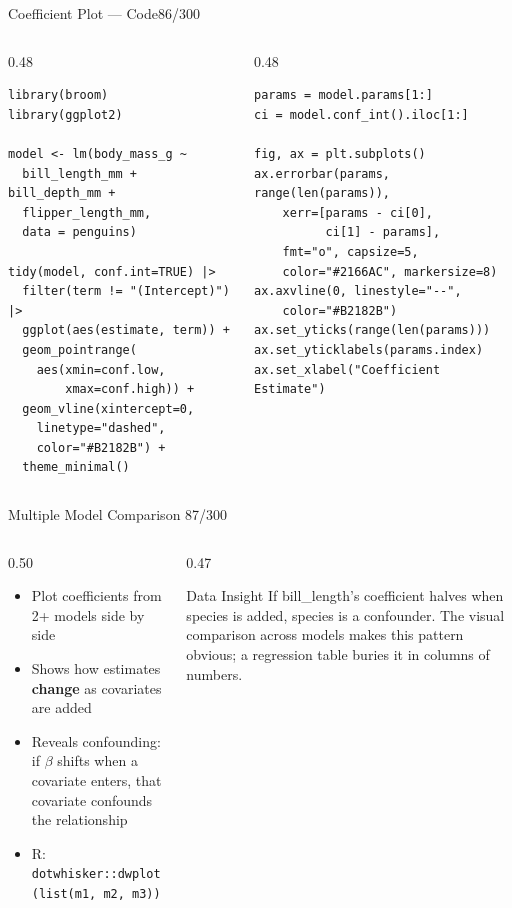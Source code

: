 \documentclass[10pt]{beamer}
\newcommand{\smark}[1]{\hfill{\scriptsize\color{codegray}#1}}
\begin{document}
\begin{frame}[fragile]{Coefficient Plot --- Code}\smark{86/300}
\begin{columns}[T]
\begin{column}{0.48\textwidth}
\begin{lstlisting}[style=Rstyle]
library(broom)
library(ggplot2)

model <- lm(body_mass_g ~
  bill_length_mm + bill_depth_mm +
  flipper_length_mm,
  data = penguins)

tidy(model, conf.int=TRUE) |>
  filter(term != "(Intercept)") |>
  ggplot(aes(estimate, term)) +
  geom_pointrange(
    aes(xmin=conf.low,
        xmax=conf.high)) +
  geom_vline(xintercept=0,
    linetype="dashed",
    color="#B2182B") +
  theme_minimal()
\end{lstlisting}
\end{column}
\begin{column}{0.48\textwidth}
\begin{lstlisting}[style=Pystyle]
params = model.params[1:]
ci = model.conf_int().iloc[1:]

fig, ax = plt.subplots()
ax.errorbar(params, range(len(params)),
    xerr=[params - ci[0],
          ci[1] - params],
    fmt="o", capsize=5,
    color="#2166AC", markersize=8)
ax.axvline(0, linestyle="--",
    color="#B2182B")
ax.set_yticks(range(len(params)))
ax.set_yticklabels(params.index)
ax.set_xlabel("Coefficient Estimate")
\end{lstlisting}
\end{column}
\end{columns}
\end{frame}

\begin{frame}{Multiple Model Comparison}
\smark{87/300}
\begin{columns}[T]
\begin{column}{0.50\textwidth}
\begin{itemize}
    \item Plot coefficients from 2+ models side by side
    \item Shows how estimates \textbf{change} as covariates are added
    \item Reveals confounding: if $\beta$ shifts when a covariate enters, that covariate confounds the relationship
    \item R: \texttt{dotwhisker::dwplot(list(m1, m2, m3))}
\end{itemize}
\end{column}
\begin{column}{0.47\textwidth}
\begin{exampleblock}{Data Insight}
    \scriptsize If bill\_length's coefficient halves when species is added, species is a confounder. The visual comparison across models makes this pattern obvious; a regression table buries it in columns of numbers.
\end{exampleblock}
\end{column}
\end{columns}
\end{frame}
\end{document}
